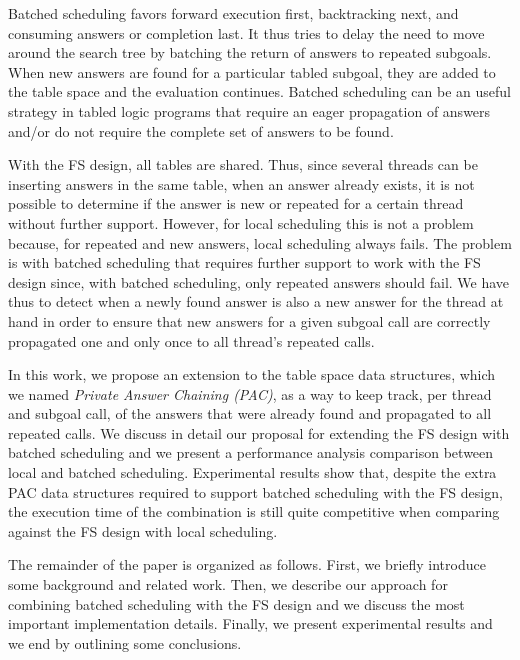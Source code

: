 \documentclass{llncs}
\begin{document}
Batched scheduling favors forward execution first, backtracking next,
and consuming answers or completion last. It thus tries to delay the
need to move around the search tree by batching the return of answers
to repeated subgoals. When new answers are found for a particular
tabled subgoal, they are added to the table space and the evaluation
continues. Batched scheduling can be an useful strategy in tabled
logic programs that require an eager propagation of answers and/or do
not require the complete set of answers to be found.

With the FS design, all tables are shared. Thus, since several threads
can be inserting answers in the same table, when an answer already
exists, it is not possible to determine if the answer is new or
repeated for a certain thread without further support. However, for
local scheduling this is not a problem because, for repeated and new
answers, local scheduling always fails. The problem is with batched
scheduling that requires further support to work with the FS design
since, with batched scheduling, only repeated answers should fail. We
have thus to detect when a newly found answer is also a new answer for
the thread at hand in order to ensure that new answers for a given
subgoal call are correctly propagated one and only once to all
thread's repeated calls.
 
In this work, we propose an extension to the table space data
structures, which we named \emph{Private Answer Chaining (PAC)}, as a
way to keep track, per thread and subgoal call, of the answers that
were already found and propagated to all repeated calls. We discuss in
detail our proposal for extending the FS design with batched
scheduling and we present a performance analysis comparison between
local and batched scheduling. Experimental results show that, despite
the extra PAC data structures required to support batched scheduling
with the FS design, the execution time of the combination is still
quite competitive when comparing against the FS design with local
scheduling.

The remainder of the paper is organized as follows. First, we briefly
introduce some background and related work. Then, we describe our
approach for combining batched scheduling with the FS design and we
discuss the most important implementation details. Finally, we present
experimental results and we end by outlining some conclusions.

\end{document}
